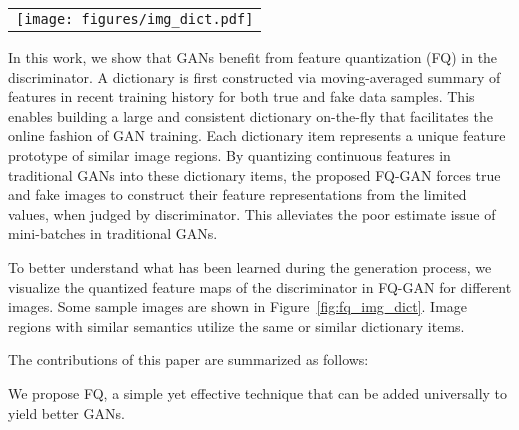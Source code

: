 \documentclass{article}
\begin{document}
\begin{figure*}[t!]\vspace{-0mm}\centering
	\begin{tabular}{c}
		\hspace{-0mm}
		\texttt{[image: figures/img\_dict.pdf]} 
	\end{tabular}
	\vspace{-2mm}
	\caption{
	The proposed FQ-GAN generates images by leveraging quantized features from a dictionary, rather than producing arbitrary features in a continuous space when judged by the discriminator. The odd columns show images of the same class (real on the top row, fake at the bottom row), whose corresponding quantized feature maps are shown in the right even column, respectively. The dictionary items are visualized in 1D as the color-bar using t-SNE~\cite{maaten2008visualizing}. 
	Image regions with similar semantics utilize the same/similar dictionary items. For example, bird neck is in dark red, sky or clear background is in shallow blue, grass is in orange. 
	 }
	\vspace{-2mm}
	\label{fig:fq_img_dict}
\end{figure*}


In this work, we show that GANs benefit from feature quantization (FQ) in the discriminator. A dictionary is first constructed via moving-averaged summary of features in recent training history for both true and fake data samples. This enables building a large and consistent dictionary on-the-fly that facilitates the online fashion of GAN training. Each dictionary item represents a unique feature prototype of similar image regions. By quantizing continuous features in traditional GANs into these dictionary items, the proposed FQ-GAN forces true and fake images to construct their feature representations from the limited values, when judged by discriminator. This alleviates the poor estimate issue of mini-batches in traditional GANs.



To better understand what has been learned during the generation process, we visualize the quantized feature maps of the discriminator in FQ-GAN for different images. Some sample images are shown in Figure~\ref{fig:fq_img_dict}. Image regions with similar semantics utilize the same or similar dictionary items.

The contributions of this paper are summarized as follows:

We propose FQ, a simple yet effective technique that can be added universally to yield better GANs.
\end{document}
